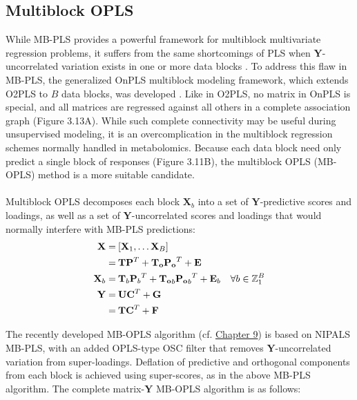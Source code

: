 \subsection{Multiblock OPLS}

\begin{doublespace}
While MB-PLS provides a powerful framework for multiblock multivariate
regression problems, it suffers from the same shortcomings of PLS when
$\mathbf{Y}$-uncorrelated variation exists in one or more data blocks
\cite{lofstedt:jchemo2011,lofstedt2012}. To address this flaw in MB-PLS,
the generalized OnPLS multiblock modeling framework, which extends O2PLS to
$B$ data blocks, was developed \cite{lofstedt2012}. Like in O2PLS, no matrix
in OnPLS is special, and all matrices are regressed against all others in a
complete association graph (Figure 3.13A). While such complete connectivity
may be useful during unsupervised modeling, it is an overcomplication in
the multiblock regression schemes normally handled in metabolomics. Because
each data block need only predict a single block of responses (Figure 3.11B),
the multiblock OPLS (MB-OPLS) method is a more suitable candidate.
\\\\
Multiblock OPLS decomposes each block $\mathbf{X}_b$ into a set of
$\mathbf{Y}$-predictive scores and loadings, as well as a set of
$\mathbf{Y}$-uncorrelated scores and loadings that would normally
interfere with MB-PLS predictions:
\begin{align}
\mathbf{X} =& \: [\mathbf{X}_1, \dots \mathbf{X}_B] \\
           =& \: \mathbf{T} \mathbf{P}^T +
                 \mathbf{T_o} \mathbf{P_o}^T + \mathbf{E} \\
\mathbf{X}_b =& \: \mathbf{T}_b {\mathbf{P}_b}^T +
                   \mathbf{T_o}_b {\mathbf{P_o}_b}^T + \mathbf{E}_b
 \quad \forall b \in \mathbb{Z}_{1}^{B} \\
\mathbf{Y} =& \: \mathbf{U} \mathbf{C}^T + \mathbf{G} \\
           =& \: \mathbf{T} \mathbf{C}^T + \mathbf{F} \nonumber
\end{align}

The recently developed MB-OPLS algorithm (cf. \hyperlink{chapter.9}{Chapter 9})
is based on NIPALS MB-PLS, with an added OPLS-type OSC filter that removes
$\mathbf{Y}$-uncorrelated variation from super-loadings. Deflation of
predictive and orthogonal components from each block is achieved using
super-scores, as in the above MB-PLS algorithm. The complete
matrix-$\mathbf{Y}$ MB-OPLS algorithm is as follows:
\end{doublespace}


